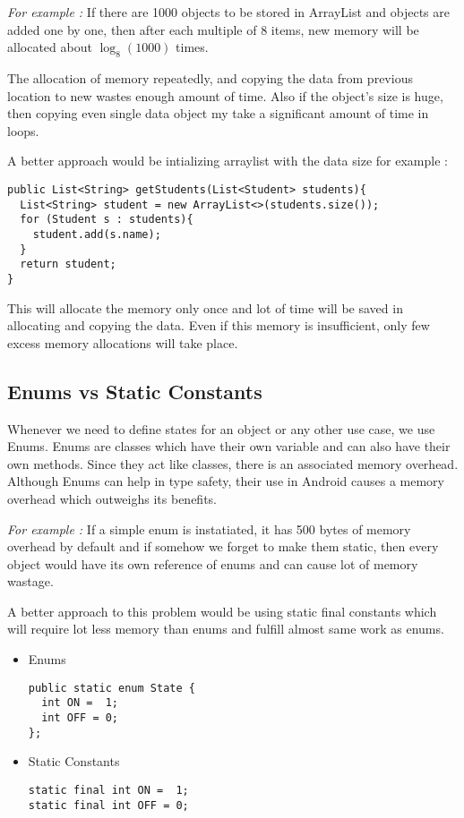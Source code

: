 \documentclass[journal]{IEEEtran}
\begin{document}
\emph{For example :} If there are 1000 objects to be stored in ArrayList and objects are added one by one, then after each multiple of 8 items, new memory will be allocated about $\log_8(1000)$ times.

The allocation of memory repeatedly, and copying the data from previous location to new wastes enough amount of time. Also if the object's size is huge, then copying even single data object my take a significant amount of time in loops.

A better approach would be intializing arraylist with the data size for example :

\begin{verbatim}
public List<String> getStudents(List<Student> students){
  List<String> student = new ArrayList<>(students.size());
  for (Student s : students){
    student.add(s.name);
  }
  return student;
}
\end{verbatim}
This will allocate the memory only once and lot of time will be saved in allocating and copying
the data. Even if this memory is insufficient, only few excess memory allocations will take place.


\subsection{Enums vs Static Constants}
Whenever we need to define states for an object or any other use case, we use Enums. Enums are classes which have their own variable and can also have their own methods. Since they act like classes, there is an associated memory overhead. Although Enums can help in type safety, their use in Android causes a memory overhead which outweighs its benefits.

\emph{For example :} If a simple enum is instatiated, it has 500 bytes of memory overhead by default and if somehow we forget to make them static, then every object would have its own reference of enums and can cause lot of memory wastage.

A better approach to this problem would be using static final constants which will require lot less memory than enums and fulfill almost same work as enums.

\begin{itemize}
	\item Enums
\begin{verbatim}
public static enum State {
  int ON =  1;
  int OFF = 0;
};
\end{verbatim}
	\item Static Constants
\begin{verbatim}
static final int ON =  1;
static final int OFF = 0;
\end{verbatim}
\end{itemize}
\end{document}
